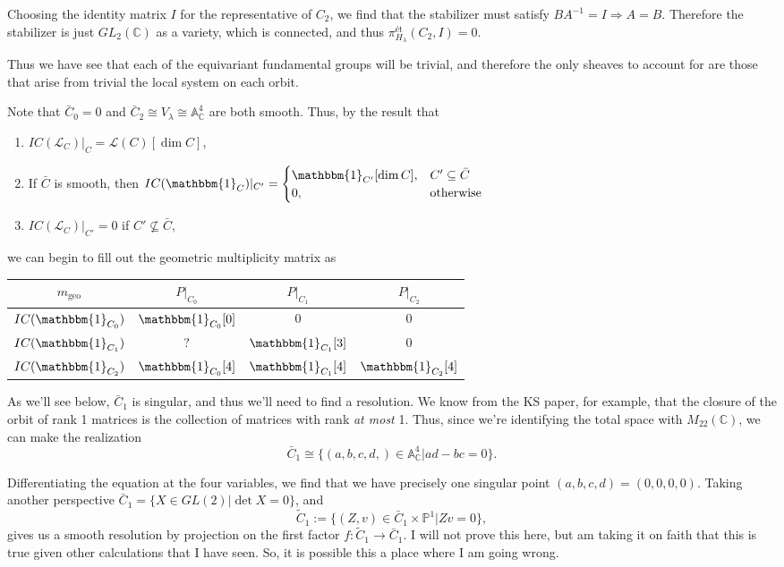 \documentclass{memoir}
\newcommand{\mc}{\mathcal}
\newcommand{\ba}{\mathbb{A}}
\newcommand{\bc}{\mathbb{C}}
\newcommand{\tx}{\text}
\theoremstyle{definition}
\begin{document}
	Choosing the identity matrix $I$ for the representative of $C_2$, we find that the stabilizer must satisfy $BA^{-1}=I\Rightarrow A=B$.  
	Therefore the stabilizer is just $GL_2(\bc)$ as a variety, which is connected, and thus $\pi_{H_\lambda}^{\tx{\'et}}(C_2, I)=0$.  
	
	Thus we have see that each of the equivariant fundamental groups will be trivial, and therefore the only sheaves to account for are those that arise from trivial the local system on each orbit.  
	
	
	Note that $\bar{C}_0=0$ and $\bar{C}_2\cong V_\lambda\cong \ba_\bc^4$ are both smooth.  
	Thus, by the result that 
	\begin{enumerate}
		\item $IC(\mc{L}_C)|_C=\mc{L}(C)[\dim C]$,
		\item If $\bar{C}$ is smooth, then $IC(\mathbbm{1}_C)|_{C'}=\begin{cases}
			\mathbbm{1}_{C'}[\dim C], & C'\subseteq \bar{C}\\
			0, & \tx{otherwise}
		\end{cases}$
		\item $IC(\mc{L}_C)|_{C'}=0$ if $C'\not\subseteq \bar{C}$,
	\end{enumerate}  
	we can begin to fill out the geometric multiplicity matrix as 
	\begin{center}
		\begin{tabular}{c | c c c}
			$m_{\tx{geo}}$ & $P|_{C_0}$ & $P|_{C_1}$ & $P|_{C_2}$ \\
			\hline
			$IC(\mathbbm{1}_{C_0})$ & $\mathbbm{1}_{C_0}[0]$ & 0 & 0 \\
			$IC(\mathbbm{1}_{C_1})$ & ? & $\mathbbm{1}_{C_1}[3]$ & 0 \\
			$IC(\mathbbm{1}_{C_2})$ & $\mathbbm{1}_{C_0}[4]$ & $\mathbbm{1}_{C_1}[4]$ & $\mathbbm{1}_{C_2}[4]$
		\end{tabular}
	\end{center}
	
	As we'll see below, $\bar{C}_1$ is singular, and thus we'll need to find a resolution.  
	We know from the KS paper, for example, that the closure of the orbit of rank 1 matrices is the collection of matrices with rank \emph{at most} 1.  
	Thus, since we're identifying the total space with $M_{22}(\bc)$, we can make the realization
	$$\bar{C}_1\cong\{(a, b, c, d,)\in \ba_\bc^4 | ad-bc=0\}.$$
	
	Differentiating the equation at the four variables, we find that we have precisely one singular point $(a, b, c, d)=(0, 0, 0, 0)$. 
	Taking another perspective $\bar{C}_1=\{X\in GL(2) | \det X=0\}$, and 
	$$\tilde{C}_1:=\{(Z, v)\in \bar{C}_1\times \mathbb{P}^1 | Zv=0\},$$
	gives us a smooth resolution by projection on the first factor $f:\tilde{C}_1\to\bar{C}_1$.  
	I will not prove this here, but am taking it on faith that this is true given other calculations that I have seen.  
	So, it is possible this a place where I am going wrong. 
	
\end{document}
